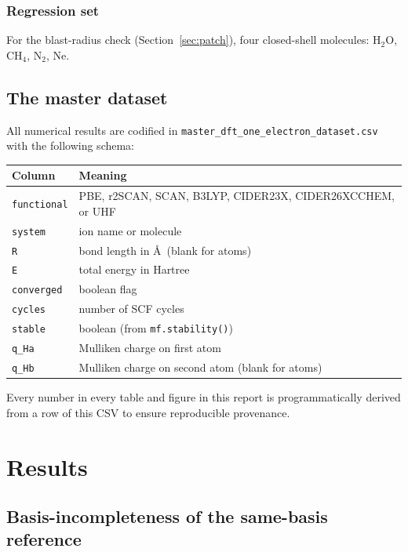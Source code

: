 \documentclass[11pt]{report}
\theoremstyle{definition}
\theoremstyle{remark}
\begin{document}
\subsection{Regression set}

For the blast-radius check (Section~\ref{sec:patch}), four closed-shell
molecules: H$_2$O, CH$_4$, N$_2$, Ne.

\section{The master dataset}

All numerical results are codified in \texttt{master\_dft\_one\_electron\_dataset.csv}
with the following schema:

\begin{center}
\begin{tabular}{ll}
\toprule
Column & Meaning \\
\midrule
\texttt{functional} & PBE, r2SCAN, SCAN, B3LYP, CIDER23X, CIDER26XCCHEM, or UHF \\
\texttt{system} & ion name or molecule \\
\texttt{R} & bond length in \AA\ (blank for atoms) \\
\texttt{E} & total energy in Hartree \\
\texttt{converged} & boolean flag \\
\texttt{cycles} & number of SCF cycles \\
\texttt{stable} & boolean (from \texttt{mf.stability()}) \\
\texttt{q\_Ha} & Mulliken charge on first atom \\
\texttt{q\_Hb} & Mulliken charge on second atom (blank for atoms) \\
\bottomrule
\end{tabular}
\end{center}

Every number in every table and figure in this report is programmatically derived
from a row of this CSV to ensure reproducible provenance.

\chapter{Results}
\label{ch:results}

\section{Basis-incompleteness of the same-basis reference}
\label{sec:basis-incompleteness}
\end{document}
